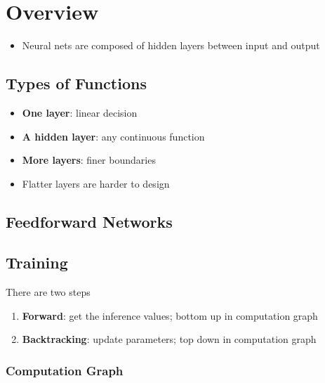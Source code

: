 \chapter{Overview}

\begin{itemize}
  \item Neural nets are composed of hidden layers between input and output
\end{itemize}

\section{Types of Functions}

  \begin{itemize}
    \item \textbf{One layer}: linear decision
    \item \textbf{A hidden layer}: any continuous function
    \item \textbf{More layers}: finer boundaries
    \item Flatter layers are harder to design
  \end{itemize}

\section{Feedforward Networks}

\section{Training}

  There are two steps

  \begin{enumerate}
    \item \textbf{Forward}: get the inference values; bottom up in computation
    graph
    \item \textbf{Backtracking}: update parameters; top down in computation
    graph
  \end{enumerate}

  \subsection{Computation Graph}

